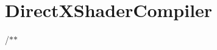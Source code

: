 \chapter{Direct\+XShader\+Compiler}
\hypertarget{md_markdown_2_setup_2_direct_x_shader_compiler}{}\label{md_markdown_2_setup_2_direct_x_shader_compiler}
/\texorpdfstring{$\ast$}{*}\texorpdfstring{$\ast$}{*} 